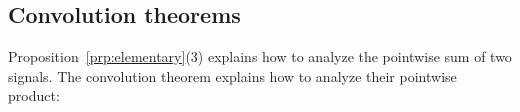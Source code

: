 



\subsection{Convolution theorems}

Proposition~\ref{prp:elementary}(3) explains how to analyze the pointwise sum
of two signals.  The convolution theorem explains how to analyze their
pointwise product:

